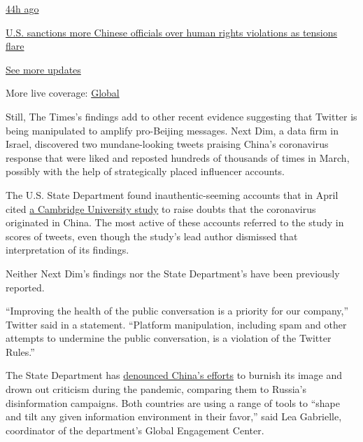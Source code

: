 \href{https://www.nytimes.com/live/2020/07/31/business/stock-market-today-coronavirus?action=click\&pgtype=Article\&state=default\&region=MAIN_CONTENT_1\&context=storylines_live_updates\#us-sanctions-more-chinese-officials-over-human-rights-violations-as-tensions-flare}{44h
ago}

\href{https://www.nytimes.com/live/2020/07/31/business/stock-market-today-coronavirus?action=click\&pgtype=Article\&state=default\&region=MAIN_CONTENT_1\&context=storylines_live_updates\#us-sanctions-more-chinese-officials-over-human-rights-violations-as-tensions-flare}{U.S.
sanctions more Chinese officials over human rights violations as
tensions flare}

\href{https://www.nytimes.com/live/2020/07/31/business/stock-market-today-coronavirus?action=click\&pgtype=Article\&state=default\&region=MAIN_CONTENT_1\&context=storylines_live_updates}{See
more updates}

More live coverage:
\href{https://www.nytimes.com/2020/08/01/world/coronavirus-covid-19.html?action=click\&pgtype=Article\&state=default\&region=MAIN_CONTENT_1\&context=storylines_live_updates}{Global}

Still, The Times's findings add to other recent evidence suggesting that
Twitter is being manipulated to amplify pro-Beijing messages. Next Dim,
a data firm in Israel, discovered two mundane-looking tweets praising
China's coronavirus response that were liked and reposted hundreds of
thousands of times in March, possibly with the help of strategically
placed influencer accounts.

The U.S. State Department found inauthentic-seeming accounts that in
April cited
\href{https://www.cam.ac.uk/research/news/covid-19-genetic-network-analysis-provides-snapshot-of-pandemic-origins}{a
Cambridge University study} to raise doubts that the coronavirus
originated in China. The most active of these accounts referred to the
study in scores of tweets, even though the study's lead author dismissed
that interpretation of its findings.

Neither Next Dim's findings nor the State Department's have been
previously reported.

``Improving the health of the public conversation is a priority for our
company,'' Twitter said in a statement. ``Platform manipulation,
including spam and other attempts to undermine the public conversation,
is a violation of the Twitter Rules.''

The State Department has
\href{https://www.nytimes.com/2020/03/28/us/politics/china-russia-coronavirus-disinformation.html}{denounced
China's efforts} to burnish its image and drown out criticism during the
pandemic, comparing them to Russia's disinformation campaigns. Both
countries are using a range of tools to ``shape and tilt any given
information environment in their favor,'' said Lea Gabrielle,
coordinator of the department's Global Engagement Center.

